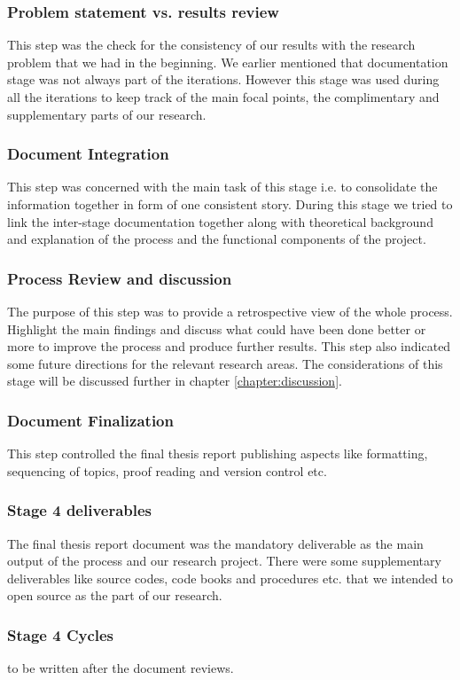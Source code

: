 \subsubsection{Problem statement vs. results review}\label{ps}
This step was the check for the consistency of our results with the research problem that we had in the beginning. We earlier mentioned that documentation stage was not always part of the iterations. However this stage was used during all the iterations to keep track of the main focal points, the complimentary and supplementary parts of our research.    
\subsubsection{Document Integration}
This step was concerned with the main task of this stage i.e. to consolidate the information together in form of one consistent story. During this stage we tried to link the inter-stage documentation together along with theoretical background and explanation of the process and the functional components of the project.
\subsubsection{Process Review and discussion}
The purpose of this step was to provide a retrospective view of the whole process. Highlight the main findings and discuss what could have been done better or more to improve the process and produce further results. This step also indicated some future directions for the relevant research areas. The considerations of this stage will be discussed further in chapter \ref{chapter:discussion}.
\subsubsection{Document Finalization}
This step controlled the final thesis report publishing aspects like formatting, sequencing of topics, proof reading and version control etc.  
\subsubsection{Stage 4 deliverables}
The final thesis report document was the mandatory deliverable  as the main output of the process and our research project. There were some supplementary deliverables like source codes, code books and procedures etc. that we intended to open source as the part of our research.   
\subsubsection{Stage 4 Cycles}
to be written after the document reviews.
